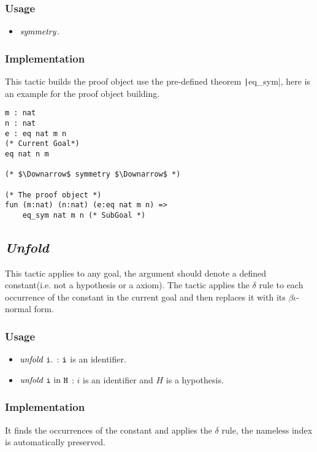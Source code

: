 \subsubsection*{Usage}
\begin{itemize}
\item ${\it symmetry}$.
\end{itemize}

\subsubsection*{Implementation}
This tactic builds the proof object use the pre-defined theorem \texttt|eq_sym|, here is an example for the proof object building.
\begin{center}
\begin{minipage}{\textwidth}
\begin{verbatim}
m : nat
n : nat
e : eq nat m n                    
(* Current Goal*)                              
eq nat n m                           

(* $\Downarrow$ symmetry $\Downarrow$ *)   

(* The proof object *)
fun (m:nat) (n:nat) (e:eq nat m n) =>   
    eq_sym nat m n (* SubGoal *)                                                
\end{verbatim}
\end{minipage}
\end{center}


\subsection{\it Unfold}
This tactic applies to any goal, the argument should denote a defined constant(i.e. not a hypothesis or a axiom).
The tactic applies the $\delta$ rule to each occurrence of the constant in the current goal and then replaces it with its $\beta\iota$-normal form.

\subsubsection*{Usage}
\begin{itemize}
\item ${\it unfold}\ \tt i.$ : $\tt i$ is an identifier. 
\item ${\it unfold}\ \tt i\ \rm in\ \tt H$ : $i$ is an identifier and $H$ is a hypothesis.
\end{itemize}

\subsubsection*{Implementation}
It finds the occurrences of the constant and applies the $\delta$ rule, the nameless index is automatically preserved.
